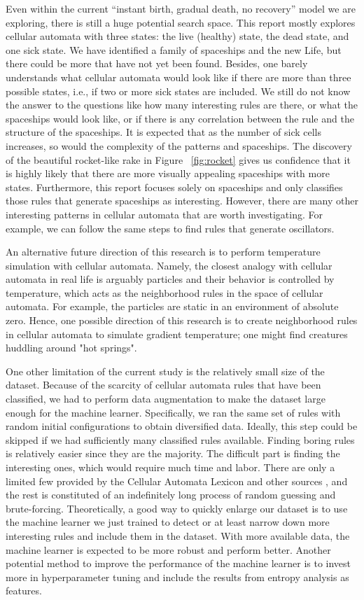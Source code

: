 \documentclass[12pt]{article}
\numberwithin{figure}{section} %
\begin{document}
Even within the current “instant birth, gradual death, no recovery” model we are exploring, there is still a huge potential search space. This report mostly explores cellular automata with three states: the live (healthy) state, the dead state, and one sick state. We have identified a family of spaceships and the new Life, but there could be more that have not yet been found. Besides, one barely understands what cellular automata would look like if there are more than three possible states, i.e., if two or more sick states are included. We still do not know the answer to the questions like how many interesting rules are there, or what the spaceships would look like, or if there is any correlation between the rule and the structure of the spaceships. It is expected that as the number of sick cells increases, so would the complexity of the patterns and spaceships. The discovery of the beautiful rocket-like rake in Figure ~\ref{fig:rocket} gives us confidence that it is highly likely that there are more visually appealing spaceships with more states. Furthermore, this report focuses solely on spaceships and only classifies those rules that generate spaceships as interesting. However, there are many other interesting patterns in cellular automata that are worth investigating. For example, we can follow the same steps to find rules that generate oscillators. 

An alternative future direction of this research is to perform temperature simulation with cellular automata. Namely, the closest analogy with cellular automata in real life is arguably particles and their behavior is controlled by temperature, which acts as the neighborhood rules in the space of cellular automata. For example, the particles are static in an environment of absolute zero. Hence, one possible direction of this research is to create neighborhood rules in cellular automata to simulate gradient temperature; one might find creatures huddling around "hot springs". 

One other limitation of the current study is the relatively small size of the dataset. Because of the scarcity of cellular automata rules that have been classified, we had to perform data augmentation to make the dataset large enough for the machine learner. Specifically, we ran the same set of rules with random initial configurations to obtain diversified data. Ideally, this step could be skipped if we had sufficiently many classified rules available. Finding boring rules is relatively easier since they are the majority. The difficult part is finding the interesting ones, which would require much time and labor. There are only a limited few provided by the Cellular Automata Lexicon and other sources \cite{Lexicon}, and the rest is constituted of an indefinitely long process of random guessing and brute-forcing. Theoretically, a good way to quickly enlarge our dataset is to use the machine learner we just trained to detect or at least narrow down more interesting rules and include them in the dataset. With more available data, the machine learner is expected to be more robust and perform better. Another potential method to improve the performance of the machine learner is to invest more in hyperparameter tuning and include the results from entropy analysis as features. 
\end{document}
